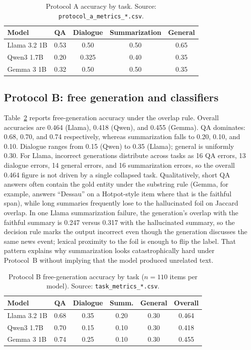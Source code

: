 \documentclass[11pt]{article}
\begin{document}
\begin{table}[t]
\centering
\caption{Protocol A accuracy by task. Source: \texttt{protocol\_a\_metrics\_*.csv}.}
\label{tab:protocol-a-task}
\begin{tabular}{lcccc}
\toprule
Model & QA & Dialogue & Summarization & General \\
\midrule
Llama 3.2 1B & 0.53 & 0.50 & 0.50 & 0.65 \\
Qwen3 1.7B & 0.20 & 0.325 & 0.40 & 0.35 \\
Gemma 3 1B & 0.32 & 0.50 & 0.50 & 0.35 \\
\bottomrule
\end{tabular}
\end{table}

\subsection{Protocol B: free generation and classifiers}

Table~\ref{tab:protocol-b} reports free-generation accuracy under the overlap
rule. Overall accuracies are 0.464 (Llama), 0.418 (Qwen), and 0.455 (Gemma).
QA dominates: 0.68, 0.70, and 0.74 respectively, whereas summarization falls to
0.20, 0.10, and 0.10. Dialogue ranges from 0.15 (Qwen) to 0.35 (Llama); general
is uniformly 0.30. For Llama, incorrect generations distribute across tasks as
16 QA errors, 13 dialogue errors, 14 general errors, and 16 summarization
errors, so the overall 0.464 figure is not driven by a single collapsed task.
Qualitatively, short QA answers often contain the gold entity under the
substring rule (Gemma, for example, answers ``Dessau'' on a Hotpot-style item
where that is the faithful span), while long summaries frequently lose to the
hallucinated foil on Jaccard overlap. In one Llama summarization failure, the
generation's overlap with the faithful summary is 0.247 versus 0.317 with the
hallucinated summary, so the decision rule marks the output incorrect even
though the generation discusses the same news event; lexical proximity to the
foil is enough to flip the label. That pattern explains why summarization looks
catastrophically hard under Protocol~B without implying that the model produced
unrelated text.

\begin{table}[t]
\centering
\caption{Protocol B free-generation accuracy by task ($n=110$ items per model). Source: \texttt{task\_metrics\_*.csv}.}
\label{tab:protocol-b}
\begin{tabular}{lccccc}
\toprule
Model & QA & Dialogue & Summ. & General & Overall \\
\midrule
Llama 3.2 1B & 0.68 & 0.35 & 0.20 & 0.30 & 0.464 \\
Qwen3 1.7B & 0.70 & 0.15 & 0.10 & 0.30 & 0.418 \\
Gemma 3 1B & 0.74 & 0.25 & 0.10 & 0.30 & 0.455 \\
\bottomrule
\end{tabular}
\end{table}
\end{document}
